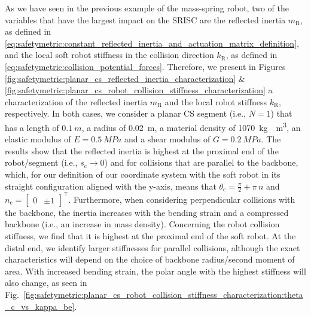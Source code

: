 As we have seen in the previous example of the mass-spring robot, two of the variables that have the largest impact on the \gls{SRISC} are the reflected inertia $m_\mathrm{R}$, as defined in
\eqref{eq:safetymetric:constant_reflected_inertia_and_actuation_matrix_definition}, and the local soft robot stiffness in the collision direction $k_\mathrm{R}$, as defined in \eqref{eq:safetymetric:collision_potential_forces}.
Therefore, we present in Figures \ref{fig:safetymetric:planar_cs_reflected_inertia_characterization} \& \ref{fig:safetymetric:planar_cs_robot_collision_stiffness_characterization} a characterization of the reflected inertia $m_\mathrm{R}$ and the local robot stiffness $k_\mathrm{R}$, respectively.
In both cases, we consider a planar \gls{CS} segment (i.e., $N=1$) that has a length of $\SI{0.1}{m}$, a radius of \SI{0.02}{m}, a material density of \SI{1070}{kg \per m^3}, an elastic modulus of $E=\SI{0.5}{MPa}$ and a shear modulus of $G=\SI{0.2}{MPa}$.
The results show that the reflected inertia is highest at the proximal end of the robot/segment (i.e., $s_\mathrm{c} \to 0$) and for collisions that are parallel to the backbone, which, for our definition of our coordinate system with the soft robot in its straight configuration aligned with the y-axis, means that $\theta_\mathrm{c} = \frac{\pi}{2} + \pi \, n$ and $n_\mathrm{c} = \begin{bmatrix}
    0 & \pm 1
\end{bmatrix}^\top$. Furthermore, when considering perpendicular collisions with the backbone, the inertia increases with the bending strain and a compressed backbone (i.e., an increase in mass density).
Concerning the robot collision stiffness, we find that it is highest at the proximal end of the soft robot. At the distal end, we identify larger stiffnesses for parallel collisions, although the exact characteristics will depend on the choice of backbone radius/second moment of area. With increased bending strain, the polar angle with the highest stiffness will also change, as seen in Fig.~\ref{fig:safetymetric:planar_cs_robot_collision_stiffness_characterization:theta_c_vs_kappa_be}.

